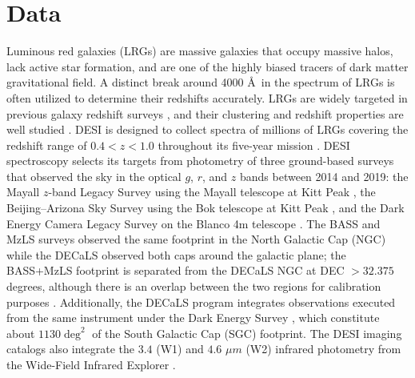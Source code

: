 \section{Data}
\label{sec:data}
Luminous red galaxies (LRGs) are massive galaxies that occupy massive halos, lack active star formation, and are one of the highly biased tracers of dark matter gravitational field. A distinct break around 4000 \AA~in the spectrum of LRGs is often utilized to determine their redshifts accurately. LRGs are widely targeted in previous galaxy redshift surveys \citep[see, e.g.,][]{eisenstein2001spectroscopic, prakash2016sdss}, and their clustering and redshift properties are well studied \citep[see, e.g.,][]{ross2020MNRAS.498.2354R, gilmarin2020MNRAS.498.2492G, bautista2021MNRAS.500..736B, chapman2022MNRAS.516..617C}. DESI is designed to collect spectra of millions of LRGs covering the redshift range of $0.4<z<1.0$ throughout its five-year mission \citep{aghamousa2016desi}. DESI spectroscopy selects its targets from photometry of three ground-based surveys that observed the sky in the optical $g$, $r$, and $z$ bands between 2014 and 2019: the Mayall $z$-band Legacy Survey using the Mayall telescope at Kitt Peak \citep[MzLS;][]{dey2018overview}, the Beijing–Arizona Sky Survey using the Bok telescope at Kitt Peak \citep[BASS;][]{zou2017project}, and the Dark Energy Camera Legacy Survey on the Blanco 4m telescope \citep[DECaLS][]{flaugher2015dark}. The BASS and MzLS surveys observed the same footprint in the North Galactic Cap (NGC) while the DECaLS observed both caps around the galactic plane; the BASS+MzLS footprint is separated from the DECaLS NGC at DEC $> 32.375$ degrees, although there is an overlap between the two regions for calibration purposes \citep{dey2018overview}. Additionally, the DECaLS program integrates observations executed from the same instrument under the Dark Energy Survey \citep{abbott2016dark}, which constitute about $1130 \deg^{2}$ of the South Galactic Cap (SGC) footprint. The DESI imaging catalogs also integrate the $3.4$ (W1) and $4.6$ $\mu m$ (W2) infrared photometry from the Wide-Field Infrared Explorer \citep[WISE;][]{wise2010AJ....140.1868W, meisner2018RNAAS...2....1M}. 

